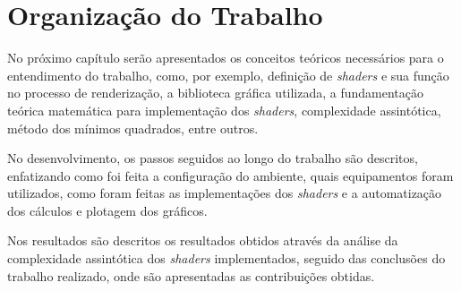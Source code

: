 \section{Organização do Trabalho}

	No próximo capítulo serão apresentados os conceitos teóricos necessários para o entendimento do trabalho, como, por exemplo, definição de \textit{shaders} e sua função no processo de renderização, a biblioteca gráfica utilizada,  a fundamentação teórica matemática para implementação dos \textit{shaders}, complexidade assintótica, método dos mínimos quadrados, entre outros. 

	No desenvolvimento, os passos seguidos ao longo do trabalho são descritos, enfatizando como foi feita a configuração do ambiente, quais equipamentos foram utilizados, como foram feitas as implementações dos \textit{shaders} e a automatização dos cálculos e plotagem dos gráficos.

	Nos resultados são descritos os resultados obtidos através da análise da complexidade assintótica dos \textit{shaders} implementados, seguido das conclusões do trabalho realizado, onde são apresentadas as contribuições obtidas.   
